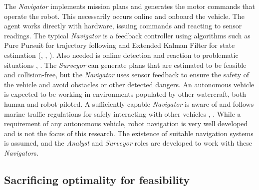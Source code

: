 \documentclass{tamuccthesis}
\begin{document}
The \textit{\textit{Navigator}} implements mission plans and generates the motor commands that operate the robot. This necessarily occurs online and onboard the vehicle. The agent works directly with hardware, issuing commands and reacting to sensor readings. The typical \textit{\textit{Navigator}} is a feedback controller using algorithms such as Pure Pursuit for trajectory following and Extended Kalman Filter for state estimation (\cite{purepursuit_kalman:2009}, \cite{kalman:naeem:2009}, \cite{gnss:gao:2016}). Also needed is online detection and reaction to problematic situations \cite{linearprog:len:2013}, . The \textit{Surveyor} can generate plans that are estimated to be feasible and collision-free, but the \textit{\textit{Navigator}} uses sensor feedback to ensure the safety of the vehicle and avoid obstacles or other detected dangers. An autonomous vehicle is expected to be working in environments populated by other watercraft, both human and robot-piloted. A sufficiently capable \textit{\textit{Navigator}} is aware of and follows marine traffic regulations for safely interacting with other vehicles \cite{naeem2012colregs}, \cite{wang:2018}. While a requirement of any autonomous vehicle, robot navigation is very well developed and is not the focus of this research. The existence of suitable navigation systems is assumed, and the \textit{Analyst} and \textit{Surveyor} roles are developed to work with these \textit{\textit{Navigator}}s. 

\subsection{Sacrificing optimality for feasibility}
\end{document}

